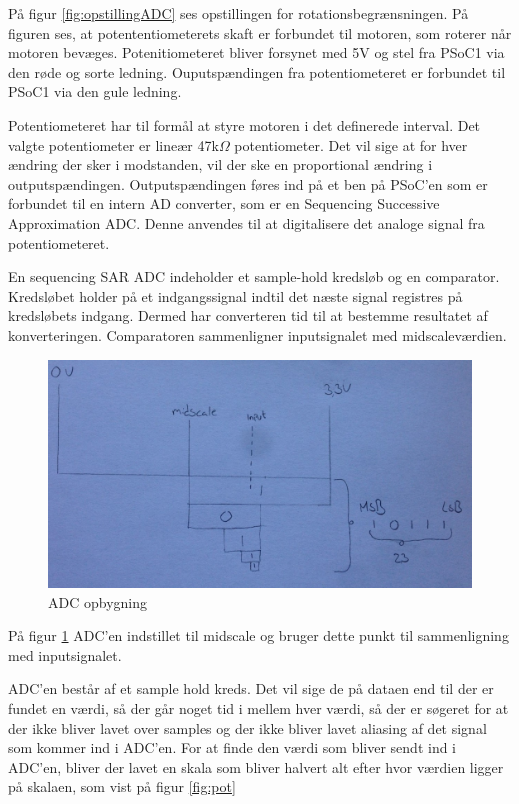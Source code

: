 \noindent På figur \ref{fig:opstillingADC} ses opstillingen for rotationsbegrænsningen. På figuren ses, at potententiometerets skaft er forbundet til motoren, som roterer når motoren bevæges. Potenitiometeret bliver forsynet med 5V og stel fra PSoC1 via den røde og sorte ledning. Ouputspændingen fra potentiometeret er forbundet til PSoC1 via den gule ledning.  \newline

Potentiometeret har til formål at styre motoren i det definerede interval. Det valgte potentiometer er lineær 47k\(\Omega\) potentiometer. Det vil sige at for hver ændring der sker i modstanden, vil der ske en proportional ændring i outputspændingen. Outputspændingen føres ind på et ben på PSoC'en som er forbundet til en intern AD converter, som er en Sequencing Successive Approximation ADC. Denne anvendes til at digitalisere det analoge signal fra potentiometeret.

En sequencing SAR ADC indeholder et sample-hold kredsløb og en comparator. Kredsløbet holder på et indgangssignal indtil det næste signal registres på kredsløbets indgang. Dermed har converteren tid til at bestemme resultatet af konverteringen. Comparatoren sammenligner inputsignalet med midscaleværdien. 

\begin{figure}[H]
	\centering
	\includegraphics[width=\textwidth]{Afsnit/DesignOgImplementering/images/ADC}
	\caption{ADC opbygning}
	\label{fig:konvertering}
\end{figure}

På figur \ref{fig:konvertering}
ADC'en indstillet til midscale og bruger dette punkt til sammenligning med inputsignalet.  

ADC’en består af et sample hold kreds. Det vil sige de på dataen end til der er fundet en værdi, så der går noget tid i mellem hver værdi, så der er søgeret for at der ikke bliver lavet over samples og der ikke bliver lavet aliasing af det signal som kommer ind i ADC’en. For at finde den værdi som bliver sendt ind i ADC'en, bliver der lavet en skala som bliver halvert alt efter hvor værdien ligger på skalaen, som vist på figur \ref{fig:pot}


